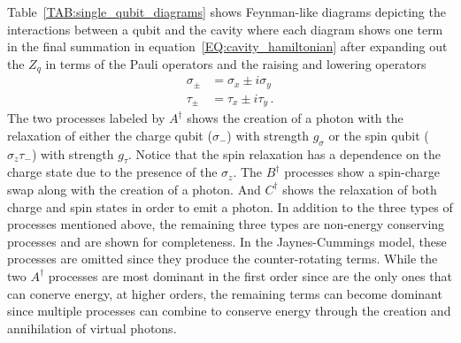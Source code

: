 \documentclass[11pt]{article}
\theoremstyle{definition}
\begin{document}
Table~\ref{TAB:single_qubit_diagrams} shows Feynman-like diagrams depicting the interactions between a qubit and the cavity where each diagram shows one term in the final summation in equation~\ref{EQ:cavity_hamiltonian} after expanding out the $Z_q$ in terms of the Pauli operators and the raising and lowering operators
\begin{align}
    \sigma_\pm & = \sigma_x \pm i\sigma_y     \\
    \tau_\pm   & = \tau_x \pm i\tau_y     \,.
\end{align}
The two processes labeled by $A^\dagger$ shows the creation of a photon with the relaxation of either the charge qubit ($\sigma_-$) with strength $g_\sigma$ or the spin qubit ($\sigma_z\tau_-$) with strength $g_\tau$.
Notice that the spin relaxation has a dependence on the charge state due to the presence of the $\sigma_z$.
The $B^\dagger$ processes show a spin-charge swap along with the creation of a photon.
And $C^\dagger$ shows the relaxation of both charge and spin states in order to emit a photon.
In addition to the three types of processes mentioned above, the remaining three types are non-energy conserving processes and are shown for completeness.
In the Jaynes-Cummings model, these processes are omitted since they produce the counter-rotating terms.
While the two $A^\dagger$ processes are most dominant in the first order since are the only ones that can conerve energy, at higher orders, the remaining terms can become dominant since multiple processes can combine to conserve energy through the creation and annihilation of virtual photons.
\end{document}
